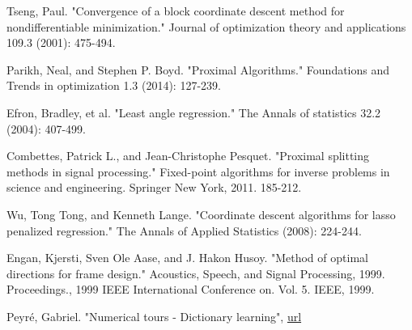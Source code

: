 \documentclass[a4paper,11pt]{article}
\begin{document}
\begin{thebibliography}{9}
Tseng, Paul. "Convergence of a block coordinate descent method for nondifferentiable minimization." Journal of optimization theory and applications 109.3 (2001): 475-494.

Parikh, Neal, and Stephen P. Boyd. "Proximal Algorithms." Foundations and Trends in optimization 1.3 (2014): 127-239.

Efron, Bradley, et al. "Least angle regression." The Annals of statistics 32.2 (2004): 407-499.

Combettes, Patrick L., and Jean-Christophe Pesquet. "Proximal splitting methods in signal processing." Fixed-point algorithms for inverse problems in science and engineering. Springer New York, 2011. 185-212.

Wu, Tong Tong, and Kenneth Lange. "Coordinate descent algorithms for lasso penalized regression." The Annals of Applied Statistics (2008): 224-244.

Engan, Kjersti, Sven Ole Aase, and J. Hakon Husoy. "Method of optimal directions for frame design." Acoustics, Speech, and Signal Processing, 1999. Proceedings., 1999 IEEE International Conference on. Vol. 5. IEEE, 1999.

Peyré, Gabriel. "Numerical tours - Dictionary learning",
\href{https://github.com/gpeyre/numerical-tours/blob/master/matlab/sparsity_4_dictionary_learning.ipynb}{url}

\end{thebibliography}
\end{document}

